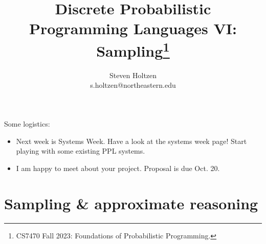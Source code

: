 \documentclass{tufte-handout}
\title{Discrete Probabilistic Programming Languages VI: Sampling\thanks{CS7470 Fall 2023: Foundations of Probabilistic Programming.}}
\author[]{Steven Holtzen\\s.holtzen@northeastern.edu}
\begin{document}
\maketitle%

Some logistics:
\begin{itemize}
  \item Next week is Systems Week. Have a look at the systems week page! Start playing with 
  some existing PPL systems.
  \item I am happy to meet about your project. Proposal is due Oct. 20.
\end{itemize}

\section{Sampling \& approximate reasoning}
\end{document}
